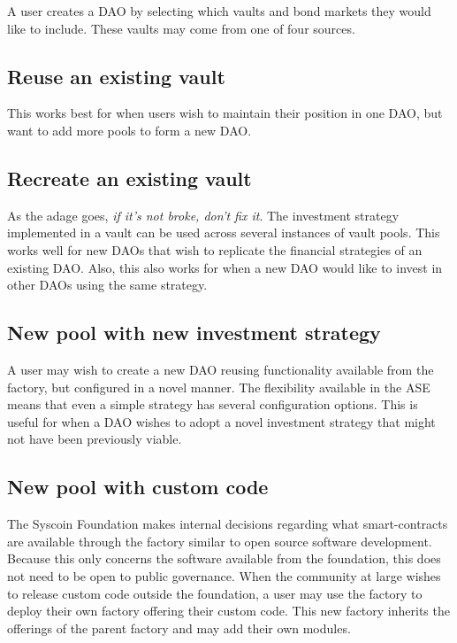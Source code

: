 \documentclass[journal,twocolumn,12pt]{ieeesyscoin}
\begin{document}
A user creates a DAO by selecting which vaults and bond markets they would like to include. These vaults may come from one of four sources.

\subsection{Reuse an existing vault}

This works best for when users wish to maintain their position in one DAO, but want to add more pools to form a new DAO.

\subsection{Recreate an existing vault}

As the adage goes, \textit{if it’s not broke, don’t fix it}. The investment strategy implemented in a vault can be used across several instances of vault pools. This works well for new DAOs that wish to replicate the financial strategies of an existing DAO. Also, this also works for when a new DAO would like to invest in other DAOs using the same strategy.

\subsection{New pool with new investment strategy}

A user may wish to create a new DAO reusing functionality available from the factory, but configured in a novel manner. The flexibility available in the ASE means that even a simple strategy has several configuration options. This is useful for when a DAO wishes to adopt a novel investment strategy that might not have been previously viable.

\subsection{New pool with custom code}

The Syscoin Foundation makes internal decisions regarding what smart-contracts are available through the factory similar to open source software development. Because this only concerns the software available from the foundation, this does not need to be open to public governance. When the community at large wishes to release custom code outside the foundation, a user may use the factory to deploy their own factory offering their custom code. This new factory inherits the offerings of the parent factory and may add their own modules.
\end{document}
